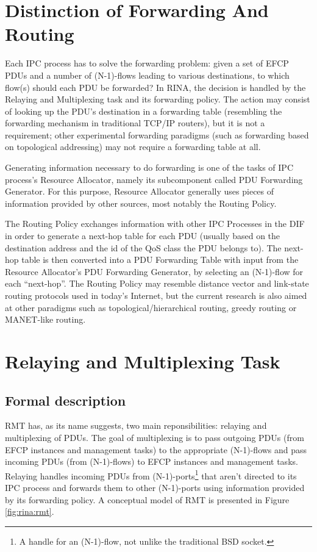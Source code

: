     \section{Distinction of Forwarding And Routing}

        Each IPC process has to solve the forwarding problem: given a set of EFCP PDUs and a number of (N-1)-flows leading to various destinations, to which flow(s) should each PDU be forwarded? In RINA, the decision is handled by the Relaying and Multiplexing task and its forwarding policy. The action may consist of looking up the PDU's destination in a forwarding table (resembling the forwarding mechanism in traditional TCP/IP routers), but it is not a requirement; other experimental forwarding paradigms (such as forwarding based on topological addressing) may not require a forwarding table at all.

        Generating information necessary to do forwarding is one of the tasks of IPC process's Resource Allocator, namely its subcomponent called PDU Forwarding Generator. For this purpose, Resource Allocator generally uses pieces of information provided by other sources, most notably the Routing Policy.

        The Routing Policy exchanges information with other IPC Processes in the DIF in order to generate a next-hop table for each PDU (usually based on the destination address and the id of the QoS class the PDU belongs to). The next-hop table is then converted into a PDU Forwarding Table with input from the Resource Allocator's PDU Forwarding Generator, by selecting an (N-1)-flow for each ``next-hop''. The Routing Policy may resemble distance vector and link-state routing protocols used in today's Internet, but the current research is also aimed at other paradigms such as topological/hierarchical routing, greedy routing or MANET-like routing.


    \section{Relaying and Multiplexing Task}

        \subsection{Formal description}

            RMT has, as its name suggests, two main reponsibilities: relaying and multiplexing of PDUs. The goal of multiplexing is to pass outgoing PDUs (from EFCP instances and management tasks) to the appropriate (N-1)-flows and pass incoming PDUs (from (N-1)-flows) to EFCP instances and management tasks. Relaying handles incoming PDUs from (N-1)-ports\footnote{A handle for an (N-1)-flow, not unlike the traditional BSD socket.} that aren't directed to its IPC process and forwards them to other (N-1)-ports using information provided by its forwarding policy. A conceptual model of RMT is presented in Figure \ref{fig:rina:rmt}.

